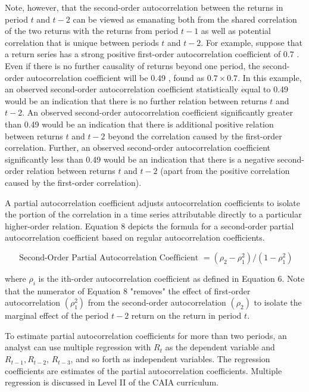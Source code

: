 \documentclass[11pt]{article}
\begin{document}
Note, however, that the second-order autocorrelation between the returns in period $t$ and $t-2$ can be viewed as emanating both from the shared correlation of the two returns with the returns from period $t-1$ as well as potential correlation that is unique between periods $t$ and $t-2$. For example, suppose that a return series has a strong positive first-order autocorrelation coefficient of 0.7 . Even if there is no further causality of returns beyond one period, the second-order autocorrelation coefficient will be 0.49 , found as $0.7 \times 0.7$. In this example, an observed second-order autocorrelation coefficient statistically equal to 0.49 would be an indication that there is no further relation between returns $t$ and $t-2$. An observed second-order autocorrelation coefficient significantly greater than 0.49 would be an indication that there is additional positive relation between returns $t$ and $t-2$ beyond the correlation caused by the first-order correlation. Further, an observed second-order autocorrelation coefficient significantly less than 0.49 would be an indication that there is a negative second-order relation between returns $t$ and $t-2$ (apart from the positive correlation caused by the first-order correlation).

A partial autocorrelation coefficient adjusts autocorrelation coefficients to isolate the portion of the correlation in a time series attributable directly to a particular higher-order relation. Equation 8 depicts the formula for a second-order partial autocorrelation coefficient based on regular autocorrelation coefficients.


\begin{equation*}
\text { Second-Order Partial Autocorrelation Coefficient }=\left(\rho_{2}-\rho_{1}^{2}\right) /\left(1-\rho_{1}^{2}\right) \tag{8}
\end{equation*}


where $\rho_{i}$ is the ith-order autocorrelation coefficient as defined in Equation 6. Note that the numerator of Equation 8 "removes" the effect of first-order autocorrelation $\left(\rho_{1}^{2}\right)$ from the second-order autocorrelation $\left(\rho_{2}\right)$ to isolate the marginal effect of the period $t-2$ return on the return in period $t$.

To estimate partial autocorrelation coefficients for more than two periods, an analyst can use multiple regression with $R_{t}$ as the dependent variable and $R_{t-1}, R_{t-2}$, $R_{t-3}$, and so forth as independent variables. The regression coefficients are estimates of the partial autocorrelation coefficients. Multiple regression is discussed in Level II of the CAIA curriculum.
\end{document}

